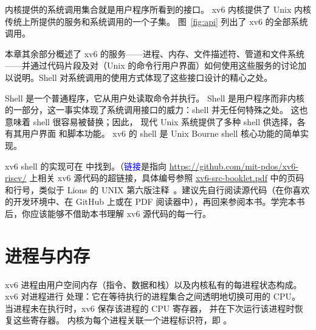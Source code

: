 内核提供的系统调用集合就是用户程序所看到的接口。
xv6 内核提供了 Unix 内核传统上所提供的服务和系统调用的一个子集。
图~\ref{fig:api}
列出了 xv6 的全部系统调用。

本章其余部分概述了 xv6 的服务——进程、内存、文件描述符、管道和文件系统——并通过代码片段及对（Unix 的命令行用户界面）如何使用这些服务的讨论加以说明。Shell 对系统调用的使用方式体现了这些接口设计的精心之处。

Shell 是一个普通程序，它从用户处读取命令并执行。
Shell 是用户程序而非内核的一部分，这一事实体现了系统调用接口的威力：shell 并无任何特殊之处。
这也意味着 shell 很容易被替换；因此，
现代 Unix 系统提供了多种
shell 供选择，各有其用户界面
和脚本功能。
xv6 的 shell 是 Unix Bourne shell 核心功能的简单实现。

xv6 shell 的实现可在
 中找到。（\textcolor{blue}{链接}是指向
\url{https://github.com/mit-pdos/xv6-riscv/} 上相关 xv6 源代码的超链接，具体编号参照
\href{xv6-src-booklet.pdf}{xv6-src-booklet.pdf} 中的页码和行号，类似于 Lions 的 UNIX 第六版注释~\cite{lions}。建议先自行阅读源代码（在你喜欢的开发环境中、在 GitHub 上或在 PDF 阅读器中），再回来参阅本书。学完本书后，你应该能够不借助本书理解 xv6 源代码的每一行。


\section{进程与内存}

xv6 进程由用户空间内存（指令、数据和栈）以及内核私有的每进程状态构成。
xv6 对进程进行
处理：它在等待执行的进程集合之间透明地切换可用的 CPU。
当进程未在执行时，xv6 保存该进程的 CPU 寄存器，
并在下次运行该进程时恢复这些寄存器。
内核为每个进程关联一个进程标识符，即
。

